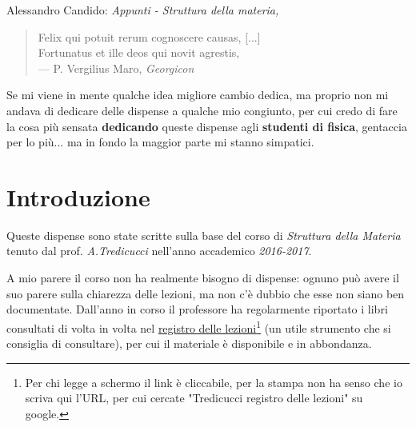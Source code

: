 \thispagestyle{empty}

\hfill

\vfill

\noindent Alessandro Candido: \textit{Appunti - Struttura della materia,}
\textcopyleft\ \DTMMonthname{\the\month} \the\year
\newline

\setcounter{tocdepth}{2}
\tableofcontents
\markboth{\scshape{\contentsname}}{\scshape{\contentsname}}

\clearpage
{}
\thispagestyle{empty}

\vspace*{3cm}

\begin{quote}
	Felix qui potuit rerum cognoscere causas, [...] \\
	Fortunatus et ille deos qui novit agrestis, \\ \medskip
	--- P. Vergilius Maro, \textit{Georgicon}
\end{quote}

\medskip

\begin{center}
	Se mi viene in mente qualche idea migliore cambio dedica, ma proprio non mi andava di dedicare delle dispense a qualche mio congiunto, per cui credo di fare la cosa più sensata \textbf{dedicando} queste dispense agli \textbf{studenti di fisica}, gentaccia per lo più... ma in fondo la maggior parte mi stanno simpatici.
\end{center}


\chapter*{Introduzione}

Queste dispense sono state scritte sulla base del corso di \textit{Struttura della Materia} tenuto dal prof. \textit{A.Tredicucci} nell'anno accademico \textit{2016-2017}.
\newline

A mio parere il corso non ha realmente bisogno di dispense: ognuno può avere il suo parere sulla chiarezza delle lezioni, ma non c'è dubbio che esse non siano ben documentate. Dall'anno in corso il professore ha regolarmente riportato i libri consultati di volta in volta nel \href{http://unimap.unipi.it/registri/dettregistriNEW.php?re=181626::::&ri=12126}{registro delle lezioni}\footnote{Per chi legge a schermo il link è cliccabile, per la stampa non ha senso che io scriva qui l'URL, per cui cercate "Tredicucci registro delle lezioni" su google.} (un utile strumento che si consiglia di consultare), per cui il materiale è disponibile e in abbondanza.
\newline

